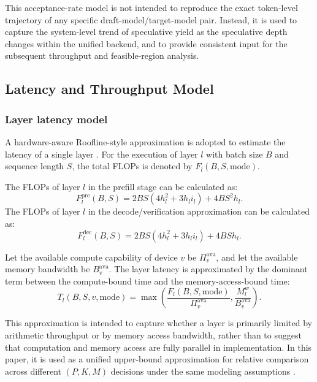 \documentclass[a4paper,fleqn]{cas-dc}
\begin{document}
This acceptance-rate model is not intended to reproduce the exact token-level trajectory of any specific draft-model/target-model pair. Instead, it is used to capture the system-level trend of speculative yield as the speculative depth changes within the unified backend, and to provide consistent input for the subsequent throughput and feasible-region analysis.

\subsection{Latency and Throughput Model}

\subsubsection{Layer latency model}

A hardware-aware Roofline-style approximation is adopted to estimate the latency of a single layer \cite{williams2009roofline}. For the execution of layer $l$ with batch size $B$ and sequence length $S$, the total FLOPs is denoted by $F_l(B,S,\mathrm{mode})$.

The FLOPs of layer $l$ in the prefill stage can be calculated as:
\begin{equation}
F_l^{\mathrm{pre}}(B,S) = 2BS(4h_l^2 + 3h_l i_l) + 4BS^2 h_l.
\end{equation}
The FLOPs of layer $l$ in the decode/verification approximation can be calculated as:
\begin{equation}
F_l^{\mathrm{dec}}(B,S) = 2BS(4h_l^2 + 3h_l i_l) + 4BSh_l.
\end{equation}

Let the available compute capability of device $v$ be $\Pi_v^{\mathrm{ava}}$, and let the available memory bandwidth be $B_v^{\mathrm{ava}}$. The layer latency is approximated by the dominant term between the compute-bound time and the memory-access-bound time:
\begin{equation}
T_l(B,S,v,\mathrm{mode}) = \max \left( \frac{F_l(B,S,\mathrm{mode})}{\Pi_v^{\mathrm{ava}}}, \frac{M_l^w}{B_v^{\mathrm{ava}}} \right).
\end{equation}

This approximation is intended to capture whether a layer is primarily limited by arithmetic throughput or by memory access bandwidth, rather than to suggest that computation and memory access are fully parallel in implementation. In this paper, it is used as a unified upper-bound approximation for relative comparison across different $(P,K,M)$ decisions under the same modeling assumptions \cite{williams2009roofline,agrawal2024vidur}.
\end{document}
